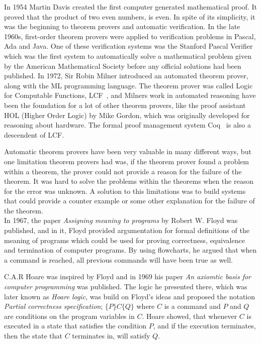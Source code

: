 In 1954 Martin Davis created the first computer generated mathematical proof. It proved that the product of two even numbers, is even. In spite of its simplicity, it was the beginning to theorem provers and automatic verification.
In the late 1960s, first-order theorem provers were applied to verification problems in Pascal, Ada and Java. One of these verification systems was the Stanford Pascal Verifier\cite{Luckham1979} which was the first system to automatically solve a mathematical problem given by the American Mathematical Society before any official solutions had been published.
In 1972, Sir Robin Milner introduced an automated theorem prover, along with the ML programming language. The theorem prover was called Logic for Computable Functions, LCF~\cite{Milner1972}, and Milners work in automated reasoning have been the foundation for a lot of other theorem provers, like the proof assistant HOL (Higher Order Logic) by Mike Gordon, which was originally developed for reasoning about hardware. The formal proof management system Coq~\cite{coq} is also a descendent of LCF.

Automatic theorem provers have been very valuable in many different ways, but one limitation theorem provers had was, if the theorem prover found a problem within a theorem, the prover could not provide a reason for the failure of the theorem. It was hard to solve the problems within the theorems when the reason for the error was unknown. A solution to this limitations was to build systems that could provide a counter example or some other explanation for the failure of the theorem. \\

In 1967, the paper \textit{Assigning meaning to programs}\cite{Floyd1967} by Robert W. Floyd was published, and in it, Floyd provided argumentation for formal definitions of the meaning of programs which could be used for proving correctness, equivalence and termination of computer programs. By using flowcharts, he argued that when a command is reached, all previous commands will have been true as well.

C.A.R Hoare was inspired by Floyd and in 1969 his paper \textit{An axiomtic basis for computer programming}\cite{Hoare1969} was published. The logic he presented there, which was later known as \textit{Hoare logic}, was build on Floyd's ideas and proposed the notation \textit{Partial correctness specification}; $\{P\} C \{Q\}$ where $C$ is a command and $P$ and $Q$ are conditions on the program variables in $C$. Hoare showed, that whenever $C$ is executed in a state that satisfies the condition $P$, and if the execution terminates, then the state that $C$ terminates in, will satisfy $Q$.

